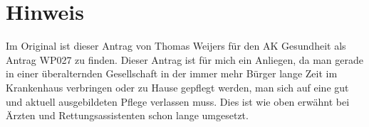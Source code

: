 \section{Hinweis}

Im Original ist dieser Antrag von Thomas Weijers für den AK Gesundheit als Antrag WP027 zu finden. Dieser Antrag ist für mich ein Anliegen, da man gerade in einer überalternden Gesellschaft in der immer mehr Bürger lange Zeit im Krankenhaus verbringen oder zu Hause gepflegt werden, man sich auf eine gut und aktuell ausgebildeten Pflege verlassen muss. Dies ist wie oben erwähnt bei Ärzten und Rettungsassistenten schon lange umgesetzt.
